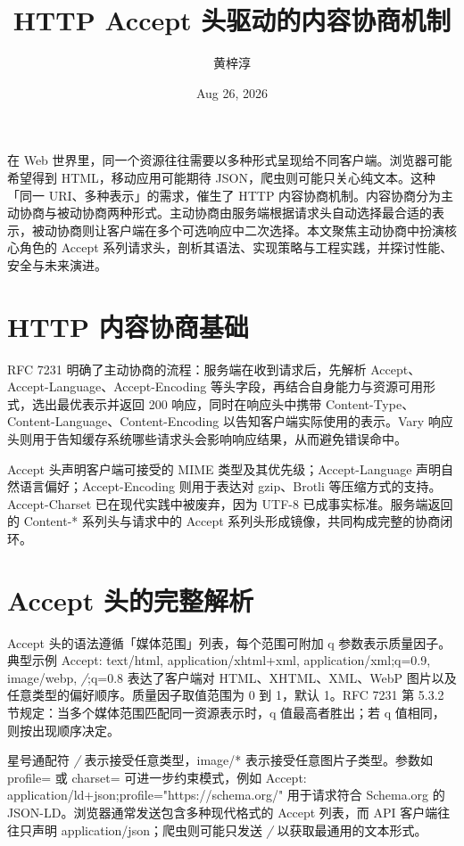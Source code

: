 \title{HTTP Accept 头驱动的内容协商机制}
\author{黄梓淳}
\date{Aug 26, 2026}
\maketitle
在 Web 世界里，同一个资源往往需要以多种形式呈现给不同客户端。浏览器可能希望得到 HTML，移动应用可能期待 JSON，爬虫则可能只关心纯文本。这种「同一 URI、多种表示」的需求，催生了 HTTP 内容协商机制。内容协商分为主动协商与被动协商两种形式。主动协商由服务端根据请求头自动选择最合适的表示，被动协商则让客户端在多个可选响应中二次选择。本文聚焦主动协商中扮演核心角色的 Accept 系列请求头，剖析其语法、实现策略与工程实践，并探讨性能、安全与未来演进。\par
\chapter{HTTP 内容协商基础}
RFC 7231 明确了主动协商的流程：服务端在收到请求后，先解析 Accept、Accept-Language、Accept-Encoding 等头字段，再结合自身能力与资源可用形式，选出最优表示并返回 200 响应，同时在响应头中携带 Content-Type、Content-Language、Content-Encoding 以告知客户端实际使用的表示。Vary 响应头则用于告知缓存系统哪些请求头会影响响应结果，从而避免错误命中。\par
Accept 头声明客户端可接受的 MIME 类型及其优先级；Accept-Language 声明自然语言偏好；Accept-Encoding 则用于表达对 gzip、Brotli 等压缩方式的支持。Accept-Charset 已在现代实践中被废弃，因为 UTF-8 已成事实标准。服务端返回的 Content-* 系列头与请求中的 Accept 系列头形成镜像，共同构成完整的协商闭环。\par
\chapter{Accept 头的完整解析}
Accept 头的语法遵循「媒体范围」列表，每个范围可附加 q 参数表示质量因子。典型示例 Accept: text/html, application/xhtml+xml, application/xml;q=0.9, image/webp, \textit{/};q=0.8 表达了客户端对 HTML、XHTML、XML、WebP 图片以及任意类型的偏好顺序。质量因子取值范围为 0 到 1，默认 1。RFC 7231 第 5.3.2 节规定：当多个媒体范围匹配同一资源表示时，q 值最高者胜出；若 q 值相同，则按出现顺序决定。\par
星号通配符 \textit{/} 表示接受任意类型，image/* 表示接受任意图片子类型。参数如 profile= 或 charset= 可进一步约束模式，例如 Accept: application/ld+json;profile="https://schema.org/" 用于请求符合 Schema.org 的 JSON-LD。浏览器通常发送包含多种现代格式的 Accept 列表，而 API 客户端往往只声明 application/json；爬虫则可能只发送 \textit{/} 以获取最通用的文本形式。\par
